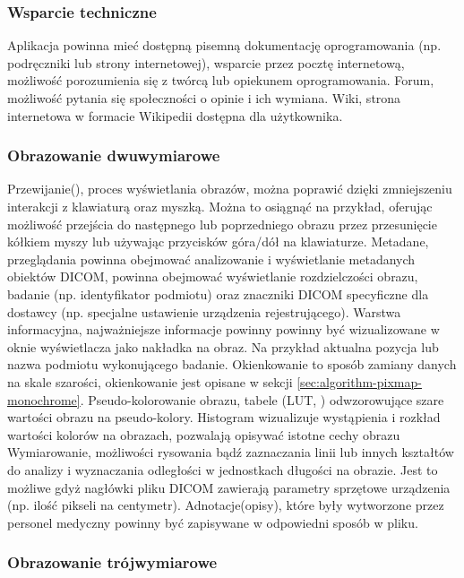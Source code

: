 \subsubsection{Wsparcie techniczne}

Aplikacja powinna mieć dostępną pisemną dokumentację oprogramowania (np. podręczniki lub strony internetowej), wsparcie przez pocztę internetową, możliwość porozumienia się z twórcą lub opiekunem oprogramowania.
Forum, możliwość pytania się społeczności o opinie i ich wymiana.
Wiki, strona internetowa w formacie Wikipedii dostępna dla użytkownika.

\subsubsection{Obrazowanie dwuwymiarowe}

Przewijanie(), proces wyświetlania obrazów, można poprawić dzięki zmniejszeniu interakcji z klawiaturą oraz myszką. Można to osiągnąć na przykład, oferując możliwość przejścia do następnego lub poprzedniego obrazu przez przesunięcie kółkiem myszy lub używając przycisków góra/dół na klawiaturze.
Metadane, przeglądania powinna obejmować analizowanie i wyświetlanie metadanych obiektów DICOM, powinna obejmować wyświetlanie rozdzielczości obrazu, badanie (np. identyfikator podmiotu) oraz znaczniki DICOM specyficzne dla dostawcy (np. specjalne ustawienie urządzenia rejestrującego).
Warstwa informacyjna, najważniejsze informacje powinny powinny być wizualizowane w oknie wyświetlacza jako nakładka na obraz.
Na przykład aktualna pozycja lub nazwa podmiotu wykonującego badanie.
Okienkowanie to sposób zamiany danych na skale szarości, okienkowanie jest opisane w sekcji \ref{sec:algorithm-pixmap-monochrome}.
Pseudo-kolorowanie obrazu, tabele (LUT, ) odwzorowujące szare wartości obrazu na pseudo-kolory.
Histogram wizualizuje wystąpienia i rozkład wartości kolorów na obrazach, pozwalają opisywać istotne cechy obrazu
Wymiarowanie, możliwości rysowania bądź zaznaczania linii lub innych kształtów do analizy i wyznaczania odległości w jednostkach długości na obrazie.
Jest to możliwe gdyż nagłówki pliku DICOM zawierają parametry sprzętowe urządzenia (np. ilość pikseli na centymetr).
Adnotacje(opisy), które były wytworzone przez personel medyczny powinny być zapisywane w odpowiedni sposób w pliku.

\subsubsection{Obrazowanie trójwymiarowe}

